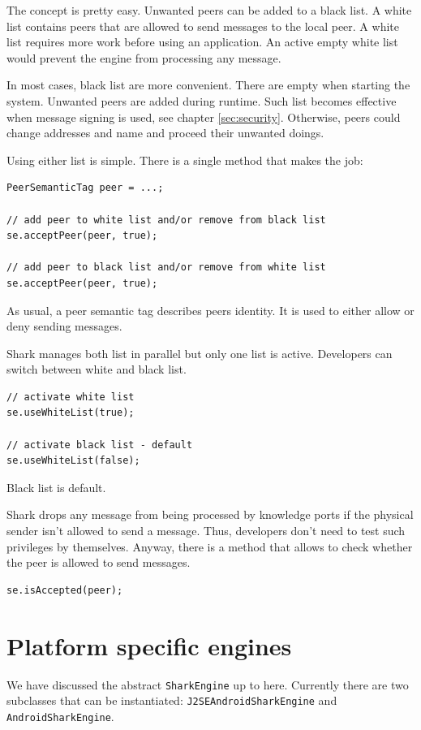 The concept is pretty easy. Unwanted peers can be added to a black list. A white list contains peers that are allowed to send messages to the local peer. A white list requires more work before using an application. An active empty white list would prevent the engine from processing any message. 

In most cases, black list are more convenient. There are empty when starting the system. Unwanted peers are added during runtime. Such list becomes effective when message signing is used, see chapter \ref{sec:security}. Otherwise, peers could change addresses and name and proceed their unwanted doings.

Using either list is simple. There is a single method that makes the job:
\begin{verbatim}
PeerSemanticTag peer = ...;

// add peer to white list and/or remove from black list
se.acceptPeer(peer, true);

// add peer to black list and/or remove from white list
se.acceptPeer(peer, true);
\end{verbatim}

As usual, a peer semantic tag describes peers identity. It is used
to either allow or deny sending messages.

Shark manages both list in parallel but only one list is active.
Developers can switch between white and black list.

\begin{verbatim}
// activate white list
se.useWhiteList(true);

// activate black list - default
se.useWhiteList(false);
\end{verbatim}

Black list is default.

Shark drops any message from being processed by knowledge ports if the physical sender isn't allowed to send a message. Thus, developers don't need to test such privileges by themselves. Anyway, there is a method that allows to check whether the peer is allowed to send messages.

\begin{verbatim}
se.isAccepted(peer);
\end{verbatim}

\section{Platform specific engines}
We have discussed the abstract {\tt SharkEngine} up to here. Currently there are two subclasses that can be instantiated: {\tt J2SEAndroidSharkEngine} and {\tt AndroidSharkEngine}.

